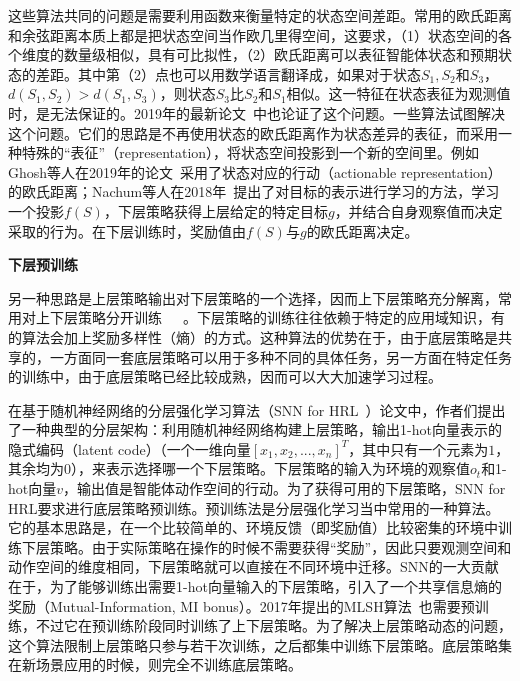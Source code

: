 这些算法共同的问题是需要利用函数来衡量特定的状态空间差距。常用的欧氏距离和余弦距离本质上都是把状态空间当作欧几里得空间，这要求，（1）状态空间的各个维度的数量级相似，具有可比拟性，（2）欧氏距离可以表征智能体状态和预期状态的差距。其中第（2）点也可以用数学语言翻译成，如果对于状态$S_1, S_2$和$S_3$，$d(S_1, S_2) > d(S_1, S_3)$，则状态$S_3$比$S_2$和$S_1$相似。这一特征在状态表征为观测值时，是无法保证的。2019年的最新论文~\cite{goal-conditioned}中也论证了这个问题。一些算法试图解决这个问题。它们的思路是不再使用状态的欧氏距离作为状态差异的表征，而采用一种特殊的``表征''（representation），将状态空间投影到一个新的空间里。例如Ghosh等人在2019年的论文~\cite{goal-conditioned}采用了状态对应的行动（actionable representation）的欧氏距离；Nachum等人在2018年~\cite{goal_repr_learning}提出了对目标的表示进行学习的方法，学习一个投影$f(S)$，下层策略获得上层给定的特定目标$g$，并结合自身观察值而决定采取的行为。在下层训练时，奖励值由$f(S)$与$g$的欧氏距离决定。

\textbf{下层预训练}

另一种思路是上层策略输出对下层策略的一个选择，因而上下层策略充分解离，常用对上下层策略分开训练~\cite{DIYAN}~\cite{SNN4hrl}~\cite{Learning_and_Transfer_of_Modulated_Locomotor_Controllers}。下层策略的训练往往依赖于特定的应用域知识，有的算法会加上奖励多样性（熵）的方式。这种算法的优势在于，由于底层策略是共享的，一方面同一套底层策略可以用于多种不同的具体任务，另一方面在特定任务的训练中，由于底层策略已经比较成熟，因而可以大大加速学习过程。

在基于随机神经网络的分层强化学习算法（SNN for HRL~\cite{SNN4hrl}）论文中，作者们提出了一种典型的分层架构：利用随机神经网络构建上层策略，输出1-hot向量表示的隐式编码（latent code）（一个一维向量$[x_1, x_2, ..., x_n]^T$，其中只有一个元素为$1$，其余均为$0$），来表示选择哪一个下层策略。下层策略的输入为环境的观察值$o_t$和1-hot向量$v$，输出值是智能体动作空间的行动。为了获得可用的下层策略，SNN for HRL要求进行底层策略预训练。预训练法是分层强化学习当中常用的一种算法。它的基本思路是，在一个比较简单的、环境反馈（即奖励值）比较密集的环境中训练下层策略。由于实际策略在操作的时候不需要获得``奖励''，因此只要观测空间和动作空间的维度相同，下层策略就可以直接在不同环境中迁移。SNN的一大贡献在于，为了能够训练出需要1-hot向量输入的下层策略，引入了一个共享信息熵的奖励（Mutual-Information, MI bonus）。2017年提出的MLSH算法~\cite{MLSH}也需要预训练，不过它在预训练阶段同时训练了上下层策略。为了解决上层策略动态的问题，这个算法限制上层策略只参与若干次训练，之后都集中训练下层策略。底层策略集在新场景应用的时候，则完全不训练底层策略。

